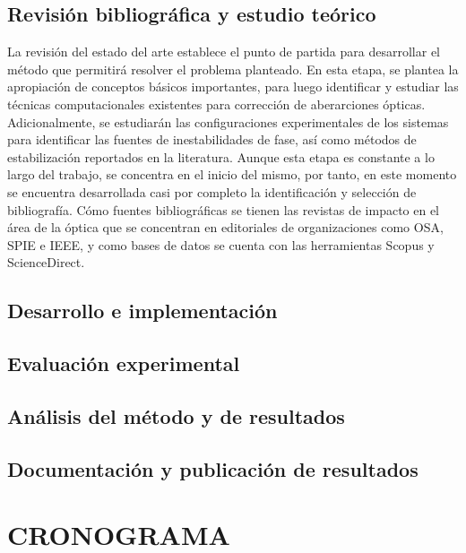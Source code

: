 \documentclass[letter, 12 pt]{article}
\begin{document}
	\subsection{Revisión bibliográfica y estudio teórico}
La revisión del estado del arte establece el punto de partida para desarrollar el método que permitirá resolver el problema planteado. En esta etapa, se plantea la apropiación de conceptos básicos importantes, para luego identificar y estudiar las técnicas computacionales existentes para corrección de aberarciones ópticas. Adicionalmente, se estudiarán las configuraciones experimentales de los sistemas para identificar las fuentes de inestabilidades de fase, así como métodos de estabilización reportados en la literatura. Aunque esta etapa es constante a lo largo del trabajo, se concentra en el inicio del mismo, por tanto, en este momento se encuentra desarrollada casi por completo la identificación y selección de bibliografía. Cómo fuentes bibliográficas se tienen las revistas de impacto en el área de la óptica que se concentran en editoriales de organizaciones como OSA, SPIE e IEEE, y como bases de datos se cuenta con las herramientas Scopus y ScienceDirect.\\


	\subsection{Desarrollo e implementación}
	
	\subsection{Evaluación experimental}

	\subsection{Análisis del método y de resultados}
			
	\subsection{Documentación y publicación de resultados}
	

\section{CRONOGRAMA}



\newpage
{}


\end{document}
